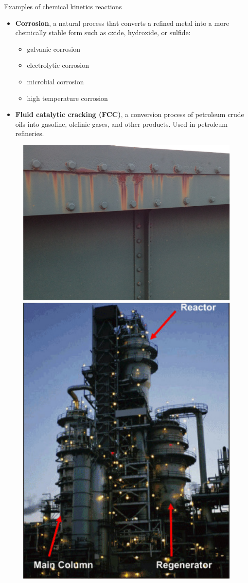 
\begin{frame}{Examples of chemical kinetics reactions}
%
\lcol

\begin{itemize}
	\item \alert{\textbf{Corrosion}}, a natural process that converts a refined metal into a more chemically stable form such as oxide, hydroxide, or sulfide:
		\begin{itemize}
		\item galvanic corrosion 
		\item electrolytic corrosion
		\item microbial corrosion
		\item high temperature corrosion
	\end{itemize}
	\pause
	\item \alert{\textbf{Fluid catalytic cracking (FCC)}}, a conversion process of petroleum crude oils into gasoline, olefinic gases, and other products. Used in petroleum refineries.
\end{itemize}      

\rcol

\begin{figure}
\centering
\includegraphics[width=0.45\columnwidth]{figures/applications/corrosion.jpg} \\[5pt]
\includegraphics[width=0.45\columnwidth]{figures/applications/fluid-catalytic-cracker}
\end{figure}

\ecol

\end{frame}
